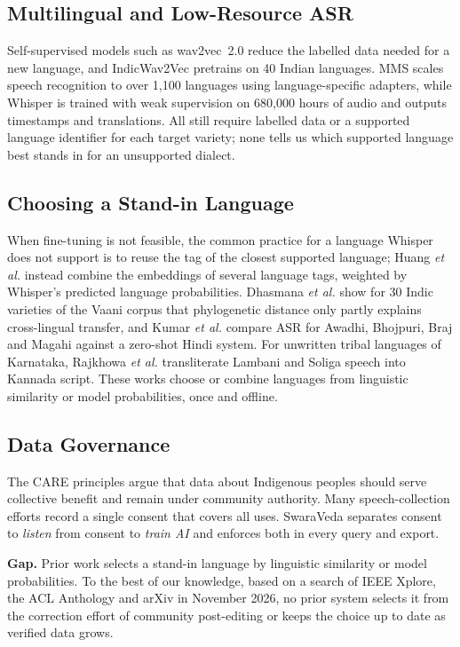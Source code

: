 \documentclass[conference]{IEEEtran}
\begin{document}
\subsection{Multilingual and Low-Resource ASR}
Self-supervised models such as wav2vec~2.0 \cite{baevski2020} reduce the labelled data needed for a new language, and IndicWav2Vec \cite{javed2022} pretrains on 40 Indian languages. MMS \cite{pratap2024} scales speech recognition to over 1,100 languages using language-specific adapters, while Whisper \cite{radford2023} is trained with weak supervision on 680,000 hours of audio and outputs timestamps and translations. All still require labelled data or a supported language identifier for each target variety; none tells us which supported language best stands in for an unsupported dialect.

\subsection{Choosing a Stand-in Language}
When fine-tuning is not feasible, the common practice for a language Whisper does not support is to reuse the tag of the closest supported language; Huang \textit{et al.} \cite{huang2025} instead combine the embeddings of several language tags, weighted by Whisper's predicted language probabilities. Dhasmana \textit{et al.} \cite{dhasmana2026} show for 30 Indic varieties of the Vaani corpus that phylogenetic distance only partly explains cross-lingual transfer, and Kumar \textit{et al.} \cite{kumar2022} compare ASR for Awadhi, Bhojpuri, Braj and Magahi against a zero-shot Hindi system. For unwritten tribal languages of Karnataka, Rajkhowa \textit{et al.} \cite{rajkhowa2023} transliterate Lambani and Soliga speech into Kannada script. These works choose or combine languages from linguistic similarity or model probabilities, once and offline.

\subsection{Data Governance}
The CARE principles \cite{carroll2020} argue that data about Indigenous peoples should serve collective benefit and remain under community authority. Many speech-collection efforts record a single consent that covers all uses. SwaraVeda separates consent to \emph{listen} from consent to \emph{train AI} and enforces both in every query and export.

\textbf{Gap.} Prior work selects a stand-in language by linguistic similarity or model probabilities. To the best of our knowledge, based on a search of IEEE Xplore, the ACL Anthology and arXiv in November 2026, no prior system selects it from the correction effort of community post-editing or keeps the choice up to date as verified data grows.
\end{document}
